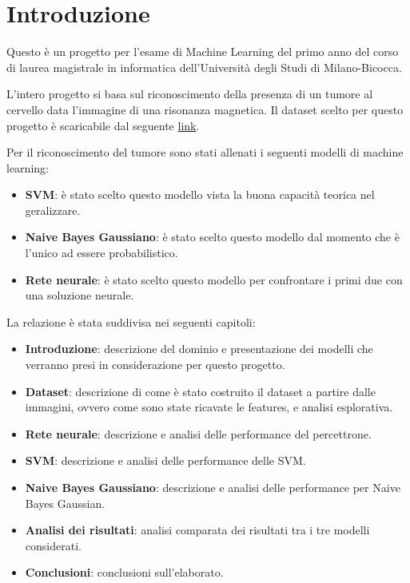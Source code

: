 \chapter{Introduzione}

Questo è un progetto per l'esame di Machine Learning del primo anno del corso 
di laurea magistrale in informatica dell'Università degli Studi di Milano-Bicocca.

L'intero progetto si basa sul riconoscimento della presenza di un tumore al cervello
data l'immagine di una risonanza magnetica. Il dataset scelto per questo progetto
è scaricabile dal seguente \href{URLhttps://www.kaggle.com/datasets/jakeshbohaju/brain-tumor/data}{link}.

Per il riconoscimento del tumore sono stati allenati i seguenti modelli di machine
learning:
\begin{itemize}
    \item \textbf{SVM}: è stato scelto questo modello vista la buona capacità
    teorica nel geralizzare.
    \item \textbf{Naive Bayes Gaussiano}: è stato scelto questo modello dal momento
    che è l'unico ad essere probabilistico.
    \item \textbf{Rete neurale}: è stato scelto questo modello per confrontare 
    i primi due con una soluzione neurale.
\end{itemize}

La relazione è stata suddivisa nei seguenti capitoli:
\begin{itemize}
    \item \textbf{Introduzione}: descrizione del dominio e presentazione dei modelli che 
    verranno presi in considerazione per questo progetto.
    \item \textbf{Dataset}: descrizione di come è stato costruito il dataset a partire
    dalle immagini, ovvero come sono state ricavate le features, e analisi esplorativa.
    \item \textbf{Rete neurale}: descrizione e analisi delle performance del percettrone.
    \item \textbf{SVM}: descrizione e analisi delle performance delle SVM.
    \item \textbf{Naive Bayes Gaussiano}: descrizione e analisi delle performance 
    per Naive Bayes Gaussian.
    \item \textbf{Analisi dei risultati}: analisi comparata dei risultati tra i 
    tre modelli considerati.
    \item \textbf{Conclusioni}: conclusioni sull'elaborato.
\end{itemize}